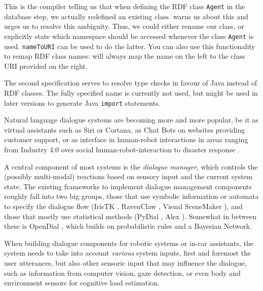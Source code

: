 This is the compiler telling us that when defining the RDF class \texttt{Agent}
in the database step, we actually redefined an existing class. \vonda warns us
about this and urges us to resolve this ambiguity. Thus, we could either rename
our class, or explicitly state which namespace should be accessed whenever the
class \texttt{Agent} is used. \texttt{nameToURI} can be used to do the latter.
You can also use this functionality to remap RDF class names: \vonda will
always map the name on the left to the class URI provided on the right.

The second specification serves to resolve type checks in favour of Java
instead of RDF classes. The fully specified name is currently not used, but
might be used in later versions to generate Java \texttt{import} statements.


Natural language dialogue systems are becoming more and more popular, be it as
virtual assistants such as Siri or Cortana, as Chat Bots on websites providing
customer support, or as interface in human-robot interactions in areas ranging
from Industry 4.0 \citep{schwartz2016hybrid} over social human-robot-interaction
\citep{alize2010} to disaster response \citep{kruijff2015tradr}.

A central component of most systems is the \emph{dialogue manager}, which
controls the (possibly multi-modal) reactions based on sensory input and the
current system state. The existing frameworks to implement dialogue management
components roughly fall into two big groups, those that use symbolic
information or automata to specify the dialogue flow (IrisTK
\citep{2012iristk}, RavenClaw \citep{bohus2009ravenclaw}, Visual SceneMaker
\citep{gebhard2012visual}), and those that mostly use statistical methods
(PyDial \cite{ultes2017pydial}, Alex \citep{jurvcivcek2014alex}). Somewhat in
between these is OpenDial \citep{lison2015developing}, which builds on
probabilistic rules and a Bayesian Network.

When building dialogue components for robotic systems or in-car assistants, the system
needs to take into account \emph{various} system inputs, first and foremost the
user utterances, but also other sensoric input that may influence the dialogue,
such as information from computer vision, gaze detection, or even body and
environment sensors for cognitive load estimation.

